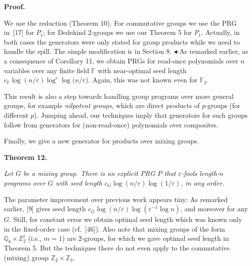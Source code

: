 \par\medskip\noindent\textbf{Proof.}\par




We use the reduction (Theorem 10). For commutative groups
we use the PRG in [17] for $P_{1}$; for Dedekind
2-groups we use our Theorem 5 for $P_{1}$. Actually,
in both cases the generators were only stated for group products while
we need to handle the spill. The simple modification is in Section 8.
$\blacktriangleleft$
As remarked earlier, as a consequence of Corollary 11, we obtain
PRGs for read-once polynomials over $n$ variables over any finite field
$\mathbb{F}$ with near-optimal seed length $c_{\mathbb{F}}\log(n/\varepsilon)\log^{c}\log(n/\varepsilon$).
Again, this was not known even for $\mathbb{F}_{3}$.\par




This result is also a step towards handling group programs over more
general groups, for example \emph{nilpotent groups,} which are direct
products of $p$-groups (for different $p$). Jumping ahead, our techniques imply that generators for such groups follow from generators for (non-read-once) polynomials over composites.\par




Finally, we give a new generator for products over mixing groups.\par





\par\medskip\noindent\textbf{
\textbf{Theorem 12}\textbf{.}
}\par



\emph{Let $G$ be a mixing group. There is an explicit PRG $P$ that $\varepsilon$-fools length-$n$ programs
over $G$ with seed length $c_{G}\log(n/\varepsilon)\log(1/\varepsilon)$, in any order.}\par






The parameter improvement over previous work appears tiny: As remarked
earlier, [9] gives seed length
$c_{G}\log(n/\varepsilon)\log(\varepsilon^{-1}\log n)$, and moreover for any $G$.
Still, for constant error we obtain optimal seed length which was
known only in the fixed-order case (cf. [46]).
Also note that mixing groups of the form $\mathbb{Q}_{8}\times\mathbb{Z}_{2}^{t}$
(i.e., $m=1$) are $2$-groups, for which we gave optimal seed length
in Theorem 5. But the techniques there do not even
apply to the commutative (mixing) group $\mathbb{Z}_{2}\times\mathbb{Z}_{3}$.\par




